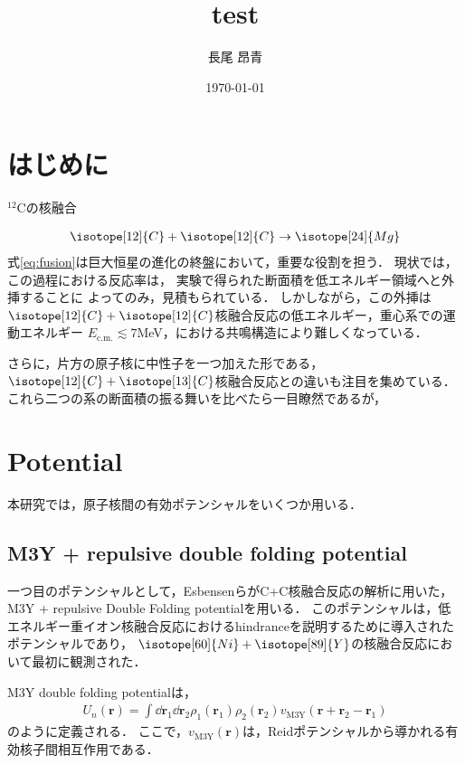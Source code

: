 \documentclass[a4paper,11pt]{ltjsarticle}
\begin{document}
\title{test}
\author{長尾 昂青}
\date{\today}
\maketitle

\tableofcontents

\newpage
\section{はじめに}

$^{12}$Cの核融合

\begin{align}\label{eq:fusion}
  \isotope[12]{C} + \isotope[12]{C} \rightarrow  \isotope[24]{Mg}
\end{align}
式\ref{eq:fusion}は巨大恒星の進化の終盤において，重要な役割を担う．
現状では，この過程における反応率は，
実験で得られた断面積を低エネルギー領域へと外挿することに
よってのみ，見積もられている．
しかしながら，この外挿は$\isotope[12]{C} + \isotope[12]{C}$核融合反応の低エネルギー，重心系での運動エネルギー
$E_\text{c.m.} \lesssim 7$MeV，における共鳴構造により難しくなっている．

さらに，片方の原子核に中性子を一つ加えた形である，$\isotope[12]{C} + \isotope[13]{C}$核融合反応との違いも注目を集めている．
これら二つの系の断面積の振る舞いを比べたら一目瞭然であるが，

\section{Potential}

本研究では，原子核間の有効ポテンシャルをいくつか用いる．
\subsection{M3Y + repulsive double folding potential}
一つ目のポテンシャルとして，Esbensenら\cite{Esbensen2011}がC+C核融合反応の解析に用いた，M3Y + repulsive Double Folding potentialを用いる．
このポテンシャルは，低エネルギー重イオン核融合反応におけるhindranceを説明するために導入されたポテンシャル\cite{PhysRevC.75.034606}であり，
$\isotope[60]{Ni} + \isotope[89]{Y}$の核融合反応において最初に観測された\cite{PhysRevLett.89.052701}．

M3Y double folding potentialは，
\begin{align}
  U_n (\bm{r}) = \int \dd{\bm{r}_1} \dd{\bm{r}_2} \rho_1(\bm{r}_1) \rho_2(\bm{r}_2) v_\mathrm{M3Y} (\bm{r} + \bm{r}_2 - \bm{r}_1)
\end{align}
のように定義される．
ここで，$v_\mathrm{M3Y}(\bm{r})$は，Reidポテンシャルから導かれる有効核子間相互作用である．
\end{document}
